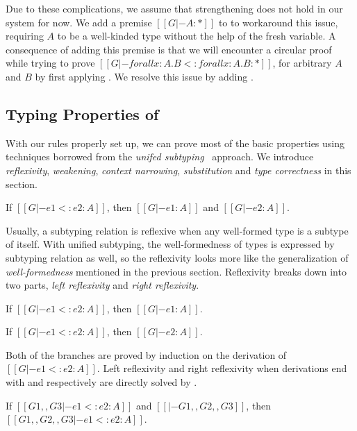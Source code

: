 Due to these complications, we assume that strengthening does not hold in our system for now.
We add a premise $[[G |- A : *]]$ to  to workaround this issue,
requiring $A$ to be a well-kinded type without the help of the fresh variable.
A consequence of adding this premise is that we will encounter a circular proof
while trying to prove $[[G |- forall x : A. B <: forall x : A . B : *]]$, for
arbitrary $A$ and $B$ by first applying . We resolve this issue by
adding .

\subsection{Typing Properties of \name}

With our rules properly set up, we can prove most of the basic properties
using techniques borrowed from the \emph{unifed subtyping}~\cite{full} approach.
We introduce \emph{reflexivity}, \emph{weakening},
\emph{context narrowing}, \emph{substitution} and \emph{type correctness}
in this section.

\begin{theorem}[Reflexivity]
   If $[[G |- e1 <: e2 : A]]$,
   then $[[G |- e1 : A]]$ and $[[G |- e2 : A]]$.
\end{theorem}

Usually, a subtyping relation is reflexive when any well-formed type is a subtype
of itself. With unified subtyping, the well-formedness of types is expressed by
subtyping relation as well, so the reflexivity looks more like the generalization
of \emph{well-formedness} mentioned in the previous section. Reflexivity
breaks down into two parts, \emph{left reflexivity} and \emph{right reflexivity}.

\begin{lemma}
   If $[[G |- e1 <: e2 : A]]$,
   then $[[G |- e1 : A]]$.
\end{lemma}

\begin{lemma}
   If $[[G |- e1 <: e2 : A]]$,
   then $[[G |- e2 : A]]$.
\end{lemma}

\noindent Both of the branches are proved by induction on the derivation of
$[[G |- e1 <: e2 : A]]$.
Left reflexivity and right reflexivity when derivations end with 
and  respectively are directly solved by .

\begin{theorem}[Weakening]
    If $[[G1 ,, G3 |- e1 <: e2 : A]]$ and $[[|- G1 ,, G2 ,, G3]]$,
    then $[[G1 ,, G2 ,, G3 |- e1 <: e2 : A]]$.
\end{theorem}

